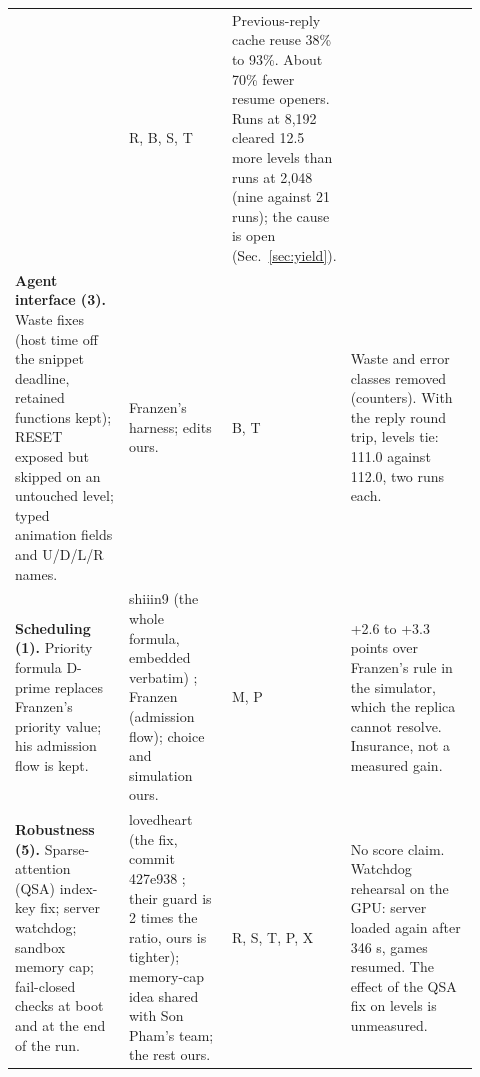 \begin{table}[!htb]
\begin{tabular}{@{}>{\raggedright\arraybackslash}p{0.27\linewidth}>{\raggedright\arraybackslash}p{0.25\linewidth}>{\raggedright\arraybackslash}p{0.08\linewidth}>{\raggedright\arraybackslash}p{0.32\linewidth}@{}}
&
R, B, S, T
&
Previous-reply cache reuse 38\% to 93\%. About 70\% fewer resume openers. Runs at 8,192 cleared 12.5 more levels than runs at 2,048 (nine against 21 runs); the cause is open (Sec.~\ref{sec:yield}). %
\\[3pt]
\textbf{Agent interface (3).}
Waste fixes (host time off the snippet deadline, retained functions kept); RESET exposed but skipped on an untouched level; typed animation fields and U/D/L/R names.
&
Franzen's harness; edits ours.
&
B, T
&
Waste and error classes removed (counters). With the reply round trip, levels tie: 111.0 against 112.0, two runs each. %
\\[3pt]
\textbf{Scheduling (1).}
Priority formula D-prime replaces Franzen's priority value; his admission flow is kept.
&
shiiin9 (the whole formula, embedded verbatim) \citep{shiiin92026dprime}; Franzen (admission flow); choice and simulation ours.
&
M, P
&
+2.6 to +3.3 points over Franzen's rule in the simulator, which the replica cannot resolve. Insurance, not a measured gain. %
\\[3pt]
\textbf{Robustness (5).}
Sparse-attention (QSA) index-key fix; server watchdog; sandbox memory cap; fail-closed checks at boot and at the end of the run.
&
lovedheart (the fix, commit 427e938 \citep{lovedheart2026qsa}; their guard is 2 times the ratio, ours is tighter); memory-cap idea shared with Son Pham's team; the rest ours. %
&
R, S, T, P, X
&
No score claim. Watchdog rehearsal on the GPU: server loaded again after 346 s, games resumed. The effect of the QSA fix on levels is unmeasured. %
\\
\bottomrule
\end{tabular}
\end{table}

